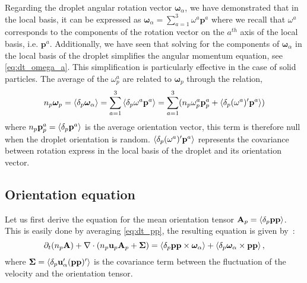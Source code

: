 Regarding the droplet angular rotation vector $\bm\omega_\alpha$, we have demonstrated that in the local basis, it can be expressed as $\bm\omega_\alpha  =\sum_{a=1}^3 \omega^a \textbf{p}^a$ where we recall that $\omega^a$ corresponds to the components of the rotation vector on the $a^{th}$ axis of the local basis, i.e. $\textbf{p}^a$.
Additionally, we have seen that solving for the components of $\bm\omega_\alpha$ in the local basis of the droplet simplifies the angular momentum equation, see \ref{eq:dt_omega_a}.  
This simplification is particularly effective in the case of solid particles. 
The average of the $\omega^a_p$ are related to $\bm\omega_p$ through the relation, 
\begin{equation}
    n_p \bm\omega_p
    = \pavg{\bm\omega_\alpha}
    =\sum_{a=1}^3\pavg{\omega^a \textbf{p}^a}
    =\sum_{a=1}^3(n_p \omega^a_p   \textbf{p}_p^a
    +\pavg{(\omega^a)' \textbf{p}^a})
    \label{eq:omega_p_local}
\end{equation}
where $n_p \textbf{p}_p^a = \left<\delta_p \textbf{p}^a\right>$ is the average orientation vector, this term is therefore null when the droplet orientation is random.  
$\left<\delta_p (\omega^a)' \textbf{p}^a\right>$ represents the covariance between rotation express in the local basis of the droplet and its orientation vector. 


\subsection{Orientation equation}

Let us first derive the equation for the mean orientation tensor $\textbf{A}_p = \left<\delta_p \textbf{pp}\right>$. 
This is easily done by averaging \ref{eq:dt_pp}, the resulting equation is given by~:
\begin{equation}
    \pddt (n_p\textbf{A})
    + \div (
        n_p\textbf{u}_p\textbf{A}_p
        + \mathbf{\Sigma}
        )
    =
    \pavg{\textbf{pp} \times \bm\omega_\alpha}
    + \pavg{\bm\omega_\alpha \times \textbf{pp}},
    \label{eq:avg_dt_pp_alpha}
\end{equation}
where $\mathbf{\Sigma} = \left<\delta_p \textbf{u}'_\alpha(\textbf{pp})'\right>$ is the covariance term between the fluctuation of the velocity and the orientation tensor.

